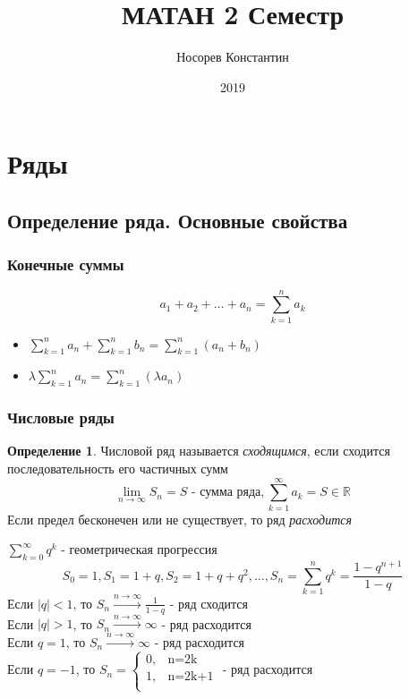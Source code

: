 \documentclass[a4paper]{article}
\title{ МАТАН 2 Семестр}
\author{Носорев Константин}
\date{2019\\}
\theoremstyle{definition}
\newtheorem{definition}{Определение}
\numberwithin{theorem}{subsection}
\numberwithin{lemma}{subsection}
\numberwithin{definition}{subsection}
\numberwithin{comment*}{subsection}
\numberwithin{consequence}{subsection}
\numberwithin{property}{subsection}
\begin{document}
\maketitle
\tableofcontents
\section{Ряды}
\subsection{Определение ряда. Основные свойства}
\setcounter{subsubsection}{-1}

\subsubsection{Конечные суммы}
$$a_1+a_2+\dots+a_n = \sum_{k=1}^{n} a_k$$
\begin{itemize}
 \item $\sum_{k=1}^{n}{a_n} + \sum_{k=1}^{n}{b_n} = \sum_{k=1}^{n}{(a_n+b_n)}$
 \item $\lambda \sum_{k=1}^{n}{a_n} = \sum_{k=1}^{n}{(\lambda a_n)}$
\end{itemize}
\subsubsection{Числовые ряды}
\begin{definition}
 Числовой ряд называется \textit{сходящимся}, если сходится последовательность его частичных сумм
 $$\lim_{n\rightarrow \infty}{S_n}=S \text{ - сумма ряда}, \sum_{k=1}^{\infty}{a_k} = S \in \mathbb{R} $$
 Если предел бесконечен или не существует, то ряд \textit{расходится}
\end{definition}
\exmp $\sum_{k=0}^{\infty}{q^k} \text{ - геометрическая прогрессия }$
$$S_0 = 1, S_1 = 1+q, S_2= 1 + q +q^2, \dots , S_n = \sum_{k=1}^{n}{q^k} = \frac{1-q^{n+1}}{1-q}$$
Если $|q| < 1$, то $S_n \xrightarrow{n\rightarrow \infty} \frac{1}{1-q}$ - ряд сходится\\
Если $|q| > 1$, то $S_n \xrightarrow{n\rightarrow \infty} \infty$ - ряд расходится\\
Если $q = 1$, то $S_n \xrightarrow{n\rightarrow \infty} \infty$ - ряд расходится\\
Если $q = -1$, то $S_n = \begin{cases}
  0, & \text{n=2k}   \\
  1, & \text{n=2k+1} \\
 \end{cases}$ - ряд расходится
\end{document}
